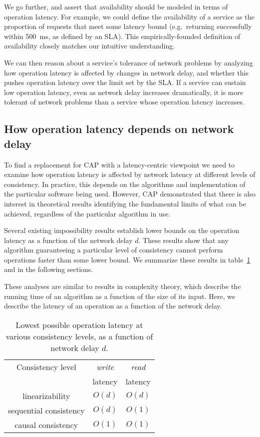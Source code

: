 \documentclass[a4paper,twocolumn,10pt]{article}
\begin{document}
We go further, and assert that availability should be modeled in terms of operation latency. For
example, we could define the availability of a service as the proportion of requests that meet some
latency bound (e.g.\ returning successfully within 500~ms, as defined by an SLA). This
empirically-founded definition of availability closely matches our intuitive understanding.

We can then reason about a service's tolerance of network problems by analyzing how operation
latency is affected by changes in network delay, and whether this pushes operation latency over the
limit set by the SLA. If a service can sustain low operation latency, even as network delay
increases dramatically, it is more tolerant of network problems than a service whose operation
latency increases.

\subsection{How operation latency depends on network delay}\label{sec:network-dependence}

To find a replacement for CAP with a latency-centric viewpoint we need to examine how operation
latency is affected by network latency at different levels of consistency. In practice, this depends
on the algorithms and implementation of the particular software being used. However, CAP
demonstrated that there is also interest in theoretical results identifying the fundamental limits
of what can be achieved, regardless of the particular algorithm in use.

Several existing impossibility results establish lower bounds on the operation latency as a function
of the network delay $d$. These results show that any algorithm guaranteeing a particular level of
consistency cannot perform operations faster than some lower bound. We summarize these results in
table~\ref{tab:op-latency} and in the following sections.

These analyses are similar to results in complexity theory, which describe the running time of an
algorithm as a function of the size of its input. Here, we describe the latency of an operation as a
function of the network delay.

\begin{table}
    \centering
    \begin{tabular}{ccc}
        Consistency level      & \textit{write} & \textit{read} \\
                               & latency        & latency \\[3pt] \hline \noalign{\vspace{6pt}}
        linearizability        & $O(d)$         & $O(d)$  \\[3pt]
        sequential consistency & $O(d)$         & $O(1)$  \\[3pt]
        causal consistency     & $O(1)$         & $O(1)$  \\[3pt] \hline
    \end{tabular}
    \caption{Lowest possible operation latency at various consistency levels, as a function of
    network delay $d$.}
    \label{tab:op-latency}
\end{table}
\end{document}
